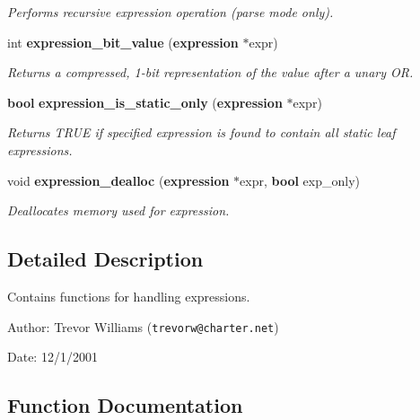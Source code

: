 \begin{CompactItemize}
\begin{CompactList}\small\item\em Performs recursive expression operation (parse mode only). \item\end{CompactList}\item 
int {\bf expression\_\-bit\_\-value} ({\bf expression} $\ast$expr)
\begin{CompactList}\small\item\em Returns a compressed, 1-bit representation of the value after a unary OR. \item\end{CompactList}\item 
{\bf bool} {\bf expression\_\-is\_\-static\_\-only} ({\bf expression} $\ast$expr)
\begin{CompactList}\small\item\em Returns TRUE if specified expression is found to contain all static leaf expressions. \item\end{CompactList}\item 
void {\bf expression\_\-dealloc} ({\bf expression} $\ast$expr, {\bf bool} exp\_\-only)
\begin{CompactList}\small\item\em Deallocates memory used for expression. \item\end{CompactList}\end{CompactItemize}


\subsection{Detailed Description}
Contains functions for handling expressions. 

\begin{Desc}
\item[Author:]Trevor Williams ({\tt trevorw@charter.net}) \end{Desc}
\begin{Desc}
\item[Date:]12/1/2001 \end{Desc}


\subsection{Function Documentation}
